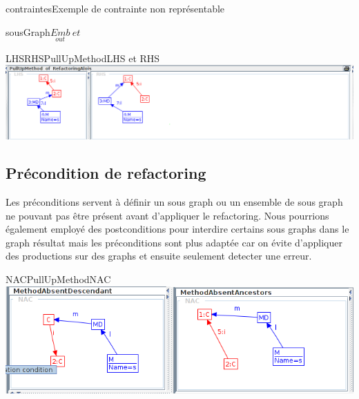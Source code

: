\documentclass[a4paper, 12pt]{article}
\begin{document}
\begin{figu}{contraintes}{Exemple de contrainte non représentable}
\begin{myfig}{sousGraph}{$\underset{out}{Emb} ~ et ~ $}

\end{myfig}


\begin{myfig}{LHSRHSPullUpMethod}{LHS et RHS}
\includegraphics[width=\textwidth]{LHSRHSPullUpMethod.png}
\end{myfig}

\subsection{Précondition de refactoring}
Les préconditions servent à définir un sous graph ou un ensemble de sous graph ne pouvant pas être présent avant d'appliquer le refactoring. Nous pourrions également employé des postconditions pour interdire
certains sous graphs dans le graph résultat mais les préconditions sont plus adaptée car on évite d'appliquer des productions sur des graphs et ensuite seulement detecter une erreur.

\begin{myfig}{NACPullUpMethod}{NAC}
\includegraphics[width=\textwidth]{NACPullUpMethod.png}
\end{myfig}


\end{figu}
\end{document}
